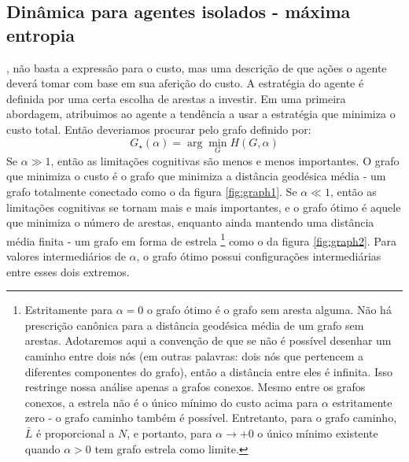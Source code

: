 \subsection{Dinâmica para agentes isolados - máxima entropia}
, não basta a expressão para o custo, mas uma descrição de que ações o agente deverá tomar com base em sua aferição do custo. A estratégia do agente é definida por uma certa escolha de arestas a investir. Em uma primeira abordagem, atribuimos ao agente a tendência a usar a estratégia que minimiza o custo total. Então deveriamos procurar pelo grafo definido por:
\begin{equation}
\label{eq:minimize}
  G_{\star}(\alpha) = \arg\min_{G} H(G,\alpha)
\end{equation}
Se $\alpha \gg 1$, então as limitações cognitivas são menos e menos importantes. O grafo que minimiza o custo é o grafo que minimiza a distância geodésica média - um grafo totalmente conectado como o da figura \ref{fig:graph1}. Se \(\alpha \ll 1\), então as limitações cognitivas se tornam mais e mais importantes, e o grafo ótimo é aquele que minimiza o número de arestas, enquanto ainda mantendo uma distância média finita - um grafo em forma de estrela \footnote{Estritamente para \(\alpha = 0\) o grafo ótimo é o grafo sem aresta alguma. Não há prescrição canônica para a distância geodésica média de um grafo sem arestas. Adotaremos aqui a convenção de que se não é possível desenhar um caminho entre dois nós (em outras palavras: dois nós que pertencem a diferentes componentes do grafo), então a distância entre eles é infinita. Isso restringe nossa análise apenas a grafos conexos. Mesmo entre os grafos conexos, a estrela não é o único mínimo do custo acima para \(\alpha\) estritamente zero - o grafo caminho 
também é possível. Entretanto, para o grafo caminho, \(\bar{L}\) é proporcional a \(N\), e portanto, para $\alpha \to +0$ o único mínimo existente quando $\alpha > 0$ tem grafo estrela como limite. } como o da figura \ref{fig:graph2}. Para valores intermediários de \(\alpha\), o grafo ótimo possui configurações intermediárias entre esses dois extremos. 

